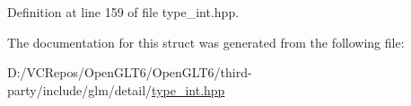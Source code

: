 Definition at line 159 of file type\+\_\+int.\+hpp.



The documentation for this struct was generated from the following file\+:\begin{DoxyCompactItemize}
\item 
D\+:/\+V\+C\+Repos/\+Open\+G\+L\+T6/\+Open\+G\+L\+T6/third-\/party/include/glm/detail/\mbox{\hyperlink{type__int_8hpp}{type\+\_\+int.\+hpp}}\end{DoxyCompactItemize}
